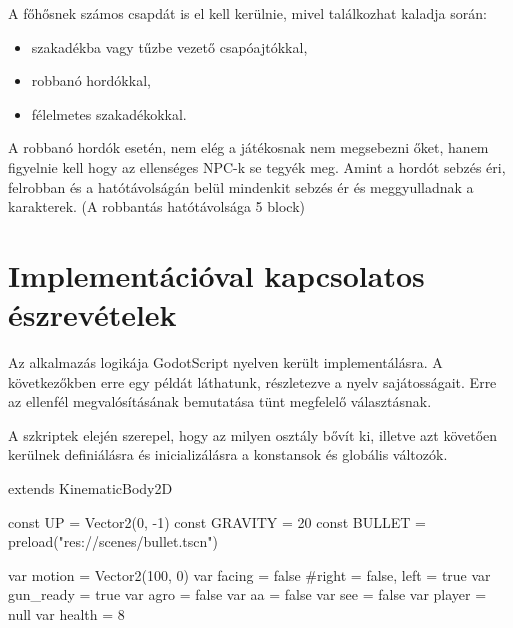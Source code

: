 \documentclass[a4paper]{article}
\begin{document}
A főhősnek számos csapdát is el kell kerülnie, mivel találkozhat kaladja során:
\begin{itemize}
\item szakadékba vagy tűzbe vezető csapóajtókkal,
\item robbanó hordókkal,
\item félelmetes szakadékokkal.
\end{itemize}

A robbanó hordók esetén, nem elég a játékosnak nem megsebezni őket, hanem figyelnie kell hogy az ellenséges NPC-k se tegyék meg.
Amint a hordót sebzés éri, felrobban és a hatótávolságán belül mindenkit sebzés ér és meggyulladnak a karakterek.
(A robbantás hatótávolsága 5 block)

\section{Implementációval kapcsolatos észrevételek}

Az alkalmazás logikája GodotScript nyelven került implementálásra. A következőkben erre egy példát láthatunk, részletezve a nyelv sajátosságait. Erre az ellenfél megvalósításának bemutatása tünt megfelelő választásnak.

A szkriptek elején szerepel, hogy az milyen osztály bővít ki, illetve azt követően kerülnek definiálásra és inicializálásra a konstansok és globális változók.
\begin{python}
extends KinematicBody2D

const UP = Vector2(0, -1)
const GRAVITY = 20
const BULLET = preload("res://scenes/bullet.tscn")

var motion = Vector2(100, 0)
var facing = false #right = false, left = true
var gun_ready = true
var agro = false
var aa = false
var see = false
var player = null
var health = 8
\end{python}
\end{document}
